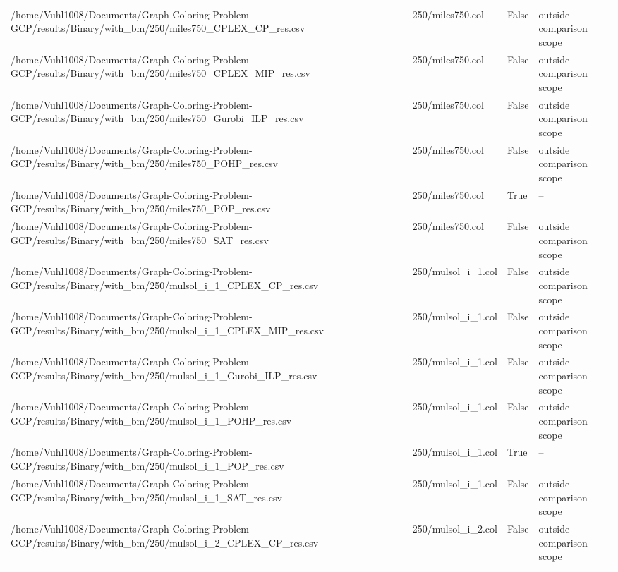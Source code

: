 \begin{table}[htbp]
\begin{tabular}{llll}
/home/Vuhl1008/Documents/Graph-Coloring-Problem-GCP/results/Binary/with\_bm/250/miles750\_CPLEX\_CP\_res.csv & 250/miles750.col & False & outside comparison scope \\
/home/Vuhl1008/Documents/Graph-Coloring-Problem-GCP/results/Binary/with\_bm/250/miles750\_CPLEX\_MIP\_res.csv & 250/miles750.col & False & outside comparison scope \\
/home/Vuhl1008/Documents/Graph-Coloring-Problem-GCP/results/Binary/with\_bm/250/miles750\_Gurobi\_ILP\_res.csv & 250/miles750.col & False & outside comparison scope \\
/home/Vuhl1008/Documents/Graph-Coloring-Problem-GCP/results/Binary/with\_bm/250/miles750\_POHP\_res.csv & 250/miles750.col & False & outside comparison scope \\
/home/Vuhl1008/Documents/Graph-Coloring-Problem-GCP/results/Binary/with\_bm/250/miles750\_POP\_res.csv & 250/miles750.col & True & -- \\
/home/Vuhl1008/Documents/Graph-Coloring-Problem-GCP/results/Binary/with\_bm/250/miles750\_SAT\_res.csv & 250/miles750.col & False & outside comparison scope \\
/home/Vuhl1008/Documents/Graph-Coloring-Problem-GCP/results/Binary/with\_bm/250/mulsol\_i\_1\_CPLEX\_CP\_res.csv & 250/mulsol\_i\_1.col & False & outside comparison scope \\
/home/Vuhl1008/Documents/Graph-Coloring-Problem-GCP/results/Binary/with\_bm/250/mulsol\_i\_1\_CPLEX\_MIP\_res.csv & 250/mulsol\_i\_1.col & False & outside comparison scope \\
/home/Vuhl1008/Documents/Graph-Coloring-Problem-GCP/results/Binary/with\_bm/250/mulsol\_i\_1\_Gurobi\_ILP\_res.csv & 250/mulsol\_i\_1.col & False & outside comparison scope \\
/home/Vuhl1008/Documents/Graph-Coloring-Problem-GCP/results/Binary/with\_bm/250/mulsol\_i\_1\_POHP\_res.csv & 250/mulsol\_i\_1.col & False & outside comparison scope \\
/home/Vuhl1008/Documents/Graph-Coloring-Problem-GCP/results/Binary/with\_bm/250/mulsol\_i\_1\_POP\_res.csv & 250/mulsol\_i\_1.col & True & -- \\
/home/Vuhl1008/Documents/Graph-Coloring-Problem-GCP/results/Binary/with\_bm/250/mulsol\_i\_1\_SAT\_res.csv & 250/mulsol\_i\_1.col & False & outside comparison scope \\
/home/Vuhl1008/Documents/Graph-Coloring-Problem-GCP/results/Binary/with\_bm/250/mulsol\_i\_2\_CPLEX\_CP\_res.csv & 250/mulsol\_i\_2.col & False & outside comparison scope \\

\end{tabular}
\end{table}
